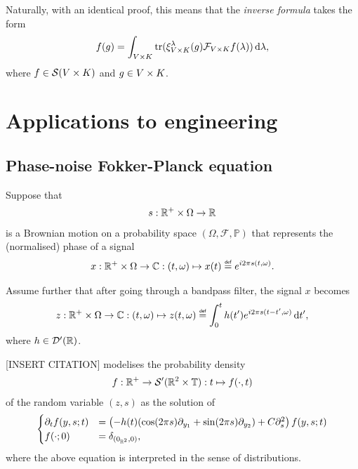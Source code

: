 Naturally,
with an identical proof,
this means that the \emph{inverse formula} takes the form
\begin{align*}
    f(g) = \int_{\GroupDirect} \tr(\Rep [\GroupDirect] \lambda(g) \Fourier [\GroupDirect] f(\lambda)) \dd \lambda,
\end{align*}
where $f \in \Schwartz \GroupDirect$ and $g \in \GroupDirect$.

\section{Applications to engineering}

\subsection{Phase-noise Fokker-Planck equation}

Suppose that
\begin{align*}
    s : \R^+ \times \Omega \to \R
\end{align*}
is a Brownian motion on a probability space $(\Omega, \mathcal F, \mathbb P)$
that represents the (normalised) phase of a signal
\begin{align*}
    x : \R^+ \times \Omega \to \C : (t, \omega) \mapsto x(t) \defeq \e^{\i \turn s(t, \omega)}.
\end{align*}

Assume further that after going through a bandpass filter,
the signal $x$ becomes
\begin{align*}
    z : \R^+ \times \Omega \to \C : (t, \omega) \mapsto z(t, \omega) \defeq \int_0^t h(t') \e^{\i \turn s(t - t', \omega)} \dd t',
\end{align*}
where $h \in \Distributions {\R}$.

[INSERT CITATION] modelises the probability density
\begin{align*}
    f : \R^+ \to \TemperedDistributions{\R^2 \times \T} : t \mapsto f(\dummy, t)
\end{align*}
of the random variable $(z, s)$ as the solution of
\begin{align}
    \begin{cases}
        \D{1}[f]{t}(y, s; t) &= \left(-h(t) (\cos (\turn s) \D{1}{{y_1} } + \sin(\turn s) \D{1}{{y_2} }) + C \D{2}{s^2}\right) f(y, s; t)\\
        f(\dummy; 0) &= \DiracDelta{(0_{\R^2}, 0)},
    \end{cases}
    \label{eq:Fokker-Planck_phase_noise}
\end{align}
where the above equation is interpreted in the sense of distributions.

